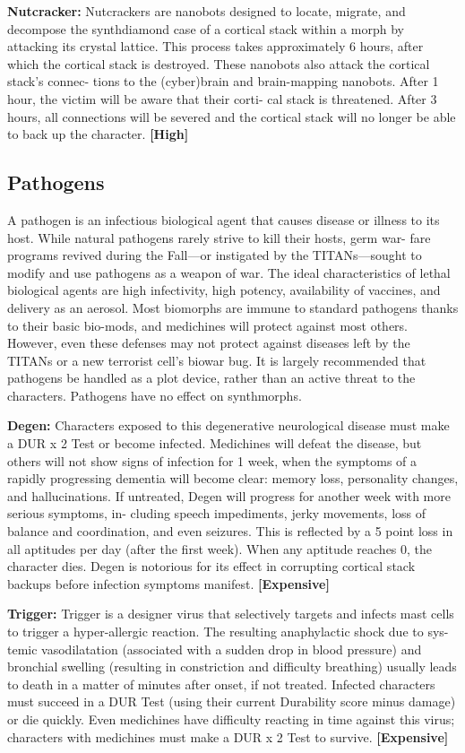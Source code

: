 \textbf{Nutcracker:} Nutcrackers are nanobots designed to 
locate, migrate, and decompose the synthdiamond 
case of a cortical stack within a morph by attacking 
its crystal lattice. This process takes approximately 
6 hours, after which the cortical stack is destroyed. 
These nanobots also attack the cortical stack's connec-
tions to the (cyber)brain and brain-mapping nanobots. 
After 1 hour, the victim will be aware that their corti-
cal stack is threatened. After 3 hours, all connections 
will be severed and the cortical stack will no longer be 
able to back up the character. \textbf{[High]}

\subsection{Pathogens}

A pathogen is an infectious biological agent that 
causes disease or illness to its host. While natural 
pathogens rarely strive to kill their hosts, germ war-
fare programs revived during the Fall—or instigated 
by the TITANs—sought to modify and use pathogens 
as a weapon of war. The ideal characteristics of lethal 
biological agents are high infectivity, high potency, 
availability of vaccines, and delivery as an aerosol. 
Most biomorphs are immune to standard pathogens 
thanks to their basic bio-mods, and medichines will 
protect against most others. However, even these 
defenses may not protect against diseases left by 
the TITANs or a new terrorist cell's biowar bug. It 
is largely recommended that pathogens be handled 
as a plot device, rather than an active threat to the 
characters. Pathogens have no effect on synthmorphs.

\textbf{Degen:} Characters exposed to this degenerative 
neurological disease must make a DUR x 2 Test or 
become infected. Medichines will defeat the disease, 
but others will not show signs of infection for 1 week, 
when the symptoms of a rapidly progressing dementia 
will become clear: memory loss, personality changes, 
and hallucinations. If untreated, Degen will progress 
for another week with more serious symptoms, in-
cluding speech impediments, jerky movements, loss 
of balance and coordination, and even seizures. This 
is reflected by a 5 point loss in all aptitudes per day 
(after the first week). When any aptitude reaches 0, 
the character dies. Degen is notorious for its effect 
in corrupting cortical stack backups before infection 
symptoms manifest. \textbf{[Expensive]}

\textbf{Trigger:} Trigger is a designer virus that selectively 
targets and infects mast cells to trigger a hyper-allergic 
reaction. The resulting anaphylactic shock due to sys-
temic vasodilatation (associated with a sudden drop 
in blood pressure) and bronchial swelling (resulting in 
constriction and difficulty breathing) usually leads to 
death in a matter of minutes after onset, if not treated. 
Infected characters must succeed in a DUR Test (using 
their current Durability score minus damage) or die 
quickly. Even medichines have difficulty reacting in 
time against this virus; characters with medichines 
must make a DUR x 2 Test to survive. \textbf{[Expensive]}

